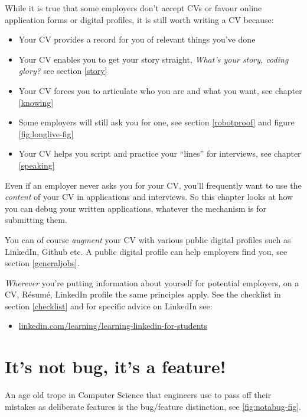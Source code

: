 \documentclass[
]{book}
\providecommand{\tightlist}{%
  \setlength{\itemsep}{0pt}\setlength{\parskip}{0pt}}
\begin{document}
While it is true that some employers don't accept CVs or favour online application forms or digital profiles, it is still worth writing a CV because:

\begin{itemize}
\tightlist
\item
  Your CV provides a record for you of relevant things you've done
\item
  Your CV enables you to get your story straight, \emph{What's your story, coding glory?} see section \ref{story} \citep{whatsthestory}
\item
  Your CV forces you to articulate who you are and what you want, see chapter \ref{knowing}
\item
  Some employers will still ask you for one, see section \ref{robotproof} and figure \ref{fig:longlive-fig}
\item
  Your CV helps you script and practice your ``lines'' for interviews, see chapter \ref{speaking}
\end{itemize}

Even if an employer never asks you for your CV, you'll frequently want to use the \emph{content} of your CV in applications and interviews. So this chapter looks at how you can debug your written applications, whatever the mechanism is for submitting them.

You can of course \emph{augment} your CV with various public digital profiles such as LinkedIn, Github etc. A public digital profile can help employers find you, see section \ref{generaljobs}.

\emph{Wherever} you're putting information about yourself for potential employers, on a CV, Résumé, LinkedIn profile the same principles apply. See the checklist in section \ref{checklist} and for specific advice on LinkedIn see:

\begin{itemize}
\tightlist
\item
  \href{https://linkedin.com/learning/learning-linkedin-for-students}{linkedin.com/learning/learning-linkedin-for-students}
\end{itemize}

\hypertarget{trope}{%
\section{It's not bug, it's a feature!}\label{trope}}

An age old trope in Computer Science that engineers use to pass off their mistakes as deliberate features is the bug/feature distinction, see \ref{fig:notabug-fig}.
\end{document}
